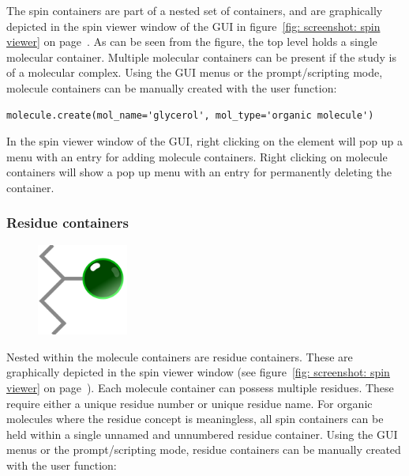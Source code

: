 The spin containers are part of a nested set of containers, and are graphically depicted in the spin viewer window of the GUI in figure~\ref{fig: screenshot: spin viewer} on page~\pageref{fig: screenshot: spin viewer}.
As can be seen from the figure, the top level holds a single molecular container.
Multiple molecular containers can be present if the study is of a molecular complex.
Using the GUI menus or the prompt/scripting mode, molecule containers can be manually created with the user function:

\begin{lstlisting}
molecule.create(mol_name='glycerol', mol_type='organic molecule')
\end{lstlisting}

In the spin viewer window of the GUI, right clicking on the  element will pop up a menu with an entry for adding molecule containers.
Right clicking on molecule containers will show a pop up menu with an entry for permanently deleting the container.



\subsubsection{Residue containers}

\begin{figure}[h]
  \includegraphics[width=3cm, bb=0 0 1701 1701]{graphics/misc/residue_600x600}
\end{figure}

Nested within the molecule containers are residue containers.
These are graphically depicted in the spin viewer window (see figure~\ref{fig: screenshot: spin viewer} on page~\pageref{fig: screenshot: spin viewer}).
Each molecule container can possess multiple residues.
These require either a unique residue number or unique residue name.
For organic molecules where the residue concept is meaningless, all spin containers can be held within a single unnamed and unnumbered residue container.
Using the GUI menus or the prompt/scripting mode, residue containers can be manually created with the user function:

